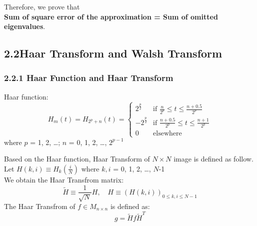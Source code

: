 \documentclass[12pt]{article}
\begin{document}
Therefore, we prove that\\
\textbf{ Sum of square error of the approximation = Sum of omitted eigenvalues}.


\subsection*{2.2\quad Haar Transform and Walsh Transform}

\subsubsection*{2.2.1 \quad Haar Function and Haar Transform}
Haar function:
    \begin{equation*}
            H_m(t) = H_{2^p+n}(t) = \begin{cases} 
                2^{\frac{p}{2}} & \text{if $\frac{n}{2^p} \leq t \leq \frac{n+0.5}{2^p}$} \\  
                -2^{\frac{p}{2}} & \text{if $\frac{n+0.5}{2^p} \leq t \leq \frac{n+1}{2^p}$} \\  
                0 & \text{elsewhere}  
                \end{cases}
    \end{equation*}
\hspace*{1cm} where $p$ = 1, 2, \ldots; $n$ = 0, 1, 2, \ldots, $2^{p-1}$
\begin{flushleft}
Based on the Haar function, Haar Transform of $N\times N$ image is defined as follow.\\
Let $H(k,i) \equiv H_{k}\left(\frac{i}{N}\right)$ where $k,i$ = 0, 1, 2, \ldots, $N$-1 \\
We obtain the Haar Transfrom matrix:
\begin{equation*}
 \tilde{H} \equiv\frac{1}{\sqrt{N}}H, \quad H \equiv(H (k,i))_{0\leqslant k,i \leqslant N-1}
\end{equation*}
The Haar Transfrom of $f \in M_{n\times n}$ is defined as:
\begin{equation*}
    g = \tilde{H}f\tilde{H}^T
\end{equation*}
\end{flushleft} 
\end{document}
